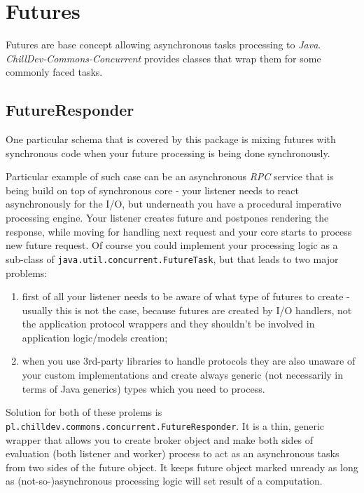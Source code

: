 %

\section{Futures}

Futures are base concept allowing asynchronous tasks processing to \emph{Java}. \emph{ChillDev-Commons-Concurrent} provides classes that wrap them for some commonly faced tasks.

\subsection{FutureResponder}

One particular schema that is covered by this package is mixing futures with synchronous code when your future processing is being done synchronously.

Particular example of such case can be an asynchronous \emph{RPC} service that is being build on top of synchronous core - your listener needs to react asynchronously for the I/O, but underneath you have a procedural imperative processing engine. Your listener creates future and postpones rendering the response, while moving for handling next request and your core starts to process new future request. Of course you could implement your processing logic as a sub-class of \texttt{java.util.concurrent.FutureTask}, but that leads to two major problems:

\begin{enumerate}
    \item first of all your listener needs to be aware of what type of futures to create - usually this is not the case, because futures are created by I/O handlers, not the application protocol wrappers and they shouldn't be involved in application logic/models creation;
    \item when you use 3rd-party libraries to handle protocols they are also unaware of your custom implementations and create always generic (not necessarily in terms of Java generics) types which you need to process.
\end{enumerate}

Solution for both of these prolems is \texttt{pl.chilldev.commons.concurrent.FutureResponder}. It is a thin, generic wrapper that allows you to create broker object and make both sides of evaluation (both listener and worker) process to act as an asynchronous tasks from two sides of the future object. It keeps future object marked unready as long as (not-so-)asynchronous processing logic will set result of a computation.

